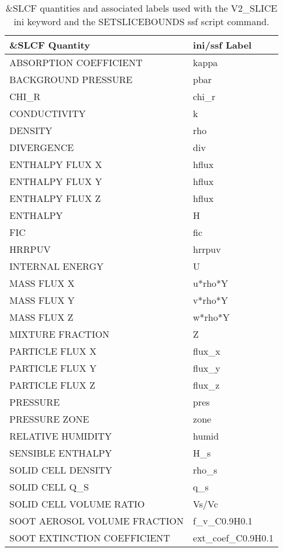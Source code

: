 \begin{table}[bph]
\begin{center}
\caption{\&SLCF quantities and associated labels used with the V2\_SLICE ini keyword and the SETSLICEBOUNDS ssf script command.}
\vspace{0.1in}
\begin{tabular}{|l|l|}
\hline
\&SLCF Quantity & ini/ssf Label \\ \hline
 ABSORPTION COEFFICIENT  &   kappa \\ \hline
 BACKGROUND PRESSURE  &   pbar \\ \hline
 CHI\_R  &   chi\_r \\ \hline
 CONDUCTIVITY  &   k \\ \hline
 DENSITY  &   rho \\ \hline
 DIVERGENCE  &   div \\ \hline
 ENTHALPY FLUX X  &   hflux \\ \hline
 ENTHALPY FLUX Y  &   hflux \\ \hline
 ENTHALPY FLUX Z  &   hflux \\ \hline
 ENTHALPY  &   H \\ \hline
 FIC  &   fic \\ \hline
 HRRPUV  &   hrrpuv \\ \hline
 INTERNAL ENERGY  &   U \\ \hline
 MASS FLUX X  &   u*rho*Y \\ \hline
 MASS FLUX Y  &   v*rho*Y \\ \hline
 MASS FLUX Z  &   w*rho*Y \\ \hline
 MIXTURE FRACTION  &   Z \\ \hline
 PARTICLE FLUX X  &   flux\_x \\ \hline
 PARTICLE FLUX Y  &   flux\_y \\ \hline
 PARTICLE FLUX Z  &   flux\_z \\ \hline
 PRESSURE  &   pres \\ \hline
 PRESSURE ZONE  &   zone \\ \hline
 RELATIVE HUMIDITY  &   humid \\ \hline
 SENSIBLE ENTHALPY  &   H\_s \\ \hline
 SOLID CELL DENSITY  &   rho\_s \\ \hline
 SOLID CELL Q\_S  &   q\_s \\ \hline
 SOLID CELL VOLUME RATIO  &   Vs/Vc \\ \hline
 SOOT AEROSOL VOLUME FRACTION  &   f\_v\_C0.9H0.1 \\ \hline
 SOOT EXTINCTION COEFFICIENT  &   ext\_coef\_C0.9H0.1 \\ \hline

\end{tabular}
\end{center}
\end{table}

